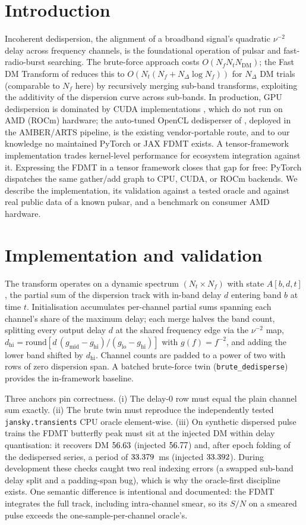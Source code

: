 \documentclass[twocolumn]{aastex631}
\newcommand{\code}[1]{\texttt{#1}}
\begin{document}
\section{Introduction}
Incoherent dedispersion, the alignment of a broadband signal's quadratic $\nu^{-2}$ delay
across frequency channels, is the foundational operation of pulsar and fast-radio-burst
searching. The
brute-force approach costs $O(N_f N_t N_\mathrm{DM})$; the Fast DM Transform of
\citet{zackayofek2017} reduces this to $O(N_t(N_f + N_\Delta \log N_f))$ for $N_\Delta$ DM trials (comparable to $N_f$ here) by recursively merging sub-band
transforms, exploiting the additivity of the dispersion curve across sub-bands. In production, GPU
dedispersion is dominated by CUDA implementations \citep[e.g.\ \code{dedisp};][]{barsdell2012},
which do not run on AMD (ROCm) hardware; the auto-tuned OpenCL dedisperser of
\citet{sclocco2016}, deployed in the AMBER/ARTS pipeline, is the existing vendor-portable
route, and to our knowledge no maintained PyTorch or JAX FDMT exists. A tensor-framework
implementation trades kernel-level performance for ecosystem integration against it. Expressing the FDMT in a tensor framework closes that gap for free: PyTorch dispatches the
same gather/add graph to CPU, CUDA, or ROCm backends. We describe the implementation, its
validation against a tested oracle and against real public data of a known pulsar, and a
benchmark on consumer AMD hardware.

\section{Implementation and validation}
The transform operates on a dynamic spectrum $(N_t \times N_f)$ with state $A[b, d, t]$, the
partial sum of the dispersion track with in-band delay $d$ entering band $b$ at time $t$.
Initialisation accumulates per-channel partial sums spanning each channel's share of the maximum
delay; each merge halves the band count, splitting every output delay $d$ at the shared frequency
edge via the $\nu^{-2}$ map, $d_\mathrm{hi} = \mathrm{round}[d\,(g_\mathrm{mid} -
g_\mathrm{hi})/(g_\mathrm{lo} - g_\mathrm{hi})]$ with $g(f)=f^{-2}$, and adding the lower band
shifted by $d_\mathrm{hi}$. Channel counts are padded to a power of two with rows of zero
dispersion span. A batched brute-force twin (\code{brute\_dedisperse}) provides the in-framework
baseline.

Three anchors pin correctness. (i) The delay-0 row must equal the plain channel sum exactly.
(ii) The brute twin must reproduce the independently tested \code{jansky.transients} CPU oracle
element-wise. (iii) On synthetic dispersed pulse trains the FDMT butterfly peak must sit at the
injected DM within delay quantisation: it recovers DM $56.63$ (injected $56.77$) and,
after epoch folding of the dedispersed series, a period of $33.379$~ms (injected $33.392$). During
development these checks caught two real indexing errors (a swapped sub-band delay split and a
padding-span bug), which is why the oracle-first discipline exists. One semantic difference is
intentional and documented: the FDMT integrates the full track, including intra-channel
smear, so its $S/N$ on a smeared pulse exceeds the one-sample-per-channel oracle's.
\end{document}
